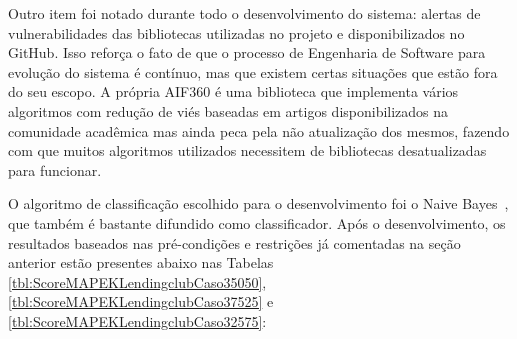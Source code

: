 \documentclass[Portugues,Final]{ic-tese-v3}
\begin{document}
Outro item foi notado durante todo o desenvolvimento do sistema: alertas de vulnerabilidades das bibliotecas utilizadas no projeto e disponibilizados no GitHub. Isso reforça o fato de que o processo de Engenharia de Software para evolução do sistema é contínuo, mas que existem certas situações que estão fora do seu escopo. A própria AIF360 é uma biblioteca que implementa vários algoritmos com redução de viés baseadas em artigos disponibilizados na comunidade acadêmica mas ainda peca pela não atualização dos mesmos, fazendo com que muitos algoritmos utilizados necessitem de bibliotecas desatualizadas para funcionar.

O algoritmo de classificação escolhido para o desenvolvimento foi o Naive Bayes~\cite{Naive_Bayes_2004}, que também é bastante difundido como classificador. Após o desenvolvimento, os resultados baseados nas pré-condições e restrições já comentadas na seção anterior estão presentes abaixo nas Tabelas \ref{tbl:ScoreMAPEKLendingclubCaso35050}, \ref{tbl:ScoreMAPEKLendingclubCaso37525} e \ref{tbl:ScoreMAPEKLendingclubCaso32575}:

\begin{table}[H]
\begin{center}
  \caption{Melhores configurações escolhidas pelo Gerenciador Autonômico \\ Uso dos algoritmos implementados - 50\% Avaliação/50\% \textit{Fairness}}
\label{tbl:ScoreMAPEKLendingclubCaso35050}
\end{center}
\end{table}
\end{document}
